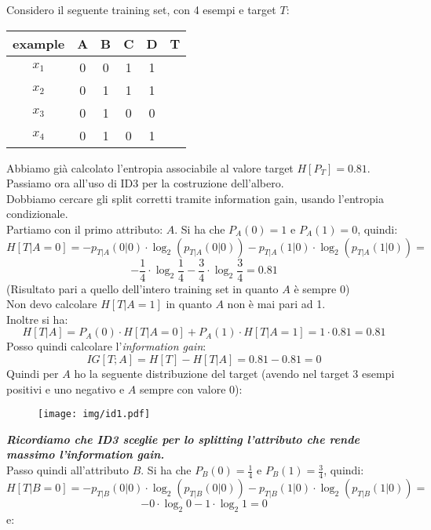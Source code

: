 \begin{esercizio}
  Considero il seguente training set, con 4 esempi e target $T$:
  \begin{table}[H]
    \centering
    \begin{tabular}{c|c|c|c|c|c}
      example & A & B & C & D & T\\
      \hline
      $x_1$ & 0 & 0 & 1 & 1 & \color{darkgreen}{1}\\
      $x_2$ & 0 & 1 & 1 & 1 & \color{darkgreen}{1}\\
      $x_3$ & 0 & 1 & 0 & 0 & \color{red}{0}\\
      $x_4$ & 0 & 1 & 0 & 1 & \color{darkgreen}{1}\\
    \end{tabular}
  \end{table}
  Abbiamo già calcolato l'entropia associabile al valore target $H[P_T]=0.81$.\\
  Passiamo ora all'uso di ID3 per la costruzione dell'albero.\\
  Dobbiamo cercare gli split corretti tramite information gain, usando
  l'entropia condizionale.\\
  Partiamo con il primo attributo: $A$. Si ha che $P_A(0)=1$ e $P_A(1)=0$,
  quindi:
  \[H[T|A=0]=-p_{T|A}(0|0)\cdot \log_2(p_{T|A}(0|0))-p_{T|A}(1|0)\cdot
    \log_2(p_{T|A}(1|0))=\]
  \[-\frac{1}{4}\cdot\log_2\frac{1}{4}-
    \frac{3}{4}\cdot\log_2\frac{3}{4}=0.81\]
  (Risultato pari a quello dell'intero training set in quanto $A$ è sempre 0)\\
  Non devo calcolare $H[T|A=1]$ in quanto $A$ non è mai pari ad 1.\\
  Inoltre si ha:
  \[H[T|A]=P_A(0)\cdot H[T|A=0]+P_A(1)\cdot H[T|A=1]=1\cdot 0.81=0.81\]
  Posso quindi calcolare l'\textit{information gain}:
  \[IG[T;A]=H[T]-H[T|A]=0.81-0.81=0\]
  Quindi per $A$ ho la seguente distribuzione del target (avendo nel target 3
  esempi positivi e uno negativo e $A$ sempre con valore 0):
  \begin{figure}[H]
    \centering
    \texttt{[image: img/id1.pdf]}
  \end{figure}
 \textbf{\textit{Ricordiamo che ID3 sceglie per lo splitting l'attributo che
     rende massimo l'information gain.}}\\
  Passo quindi all'attributo $B$. Si ha che $P_B(0)=\frac{1}{4}$ e
  $P_B(1)=\frac{3}{4}$, quindi:
  \[H[T|B=0]=-p_{T|B}(0|0)\cdot \log_2(p_{T|B}(0|0))-p_{T|B}(1|0)\cdot
    \log_2(p_{T|B}(1|0))=\]
  \[-0\cdot \log_2 0-1\cdot \log_2 1=0\]
  e:

\end{esercizio}
